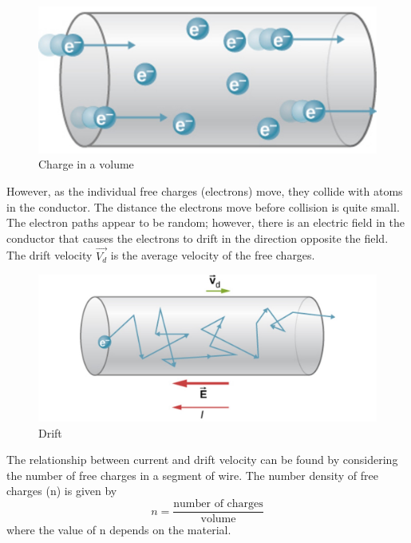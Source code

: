 \documentclass[14pt]{memoir}
\begin{document}
\begin{figure}[H]
\begin{center}
\includegraphics[scale=0.35]{fig/fig_09_07.jpg}
\caption{Charge in a volume}
\label{fig:09_07}
\end{center}
\end{figure}

However, as the individual free charges (electrons) move, they collide with atoms in the conductor. The distance the electrons move before collision is quite small. The electron paths appear to be random; however, there is an electric field in the conductor that causes the electrons to drift in the direction opposite the field. The drift velocity $\vec{V_d}$ is the average velocity of the free charges. 

\begin{figure}[H]
\begin{center}
\includegraphics[scale=0.50]{fig/fig_09_08.jpg}
\caption{Drift}
\label{fig:09_08}
\end{center}
\end{figure}

The relationship between current and drift velocity can be found by considering the number of free charges in a segment of wire. The number density of free charges (n) is given by
\begin{equation}
n = \frac{\text{number of charges}}{\text{volume}}
\end{equation}
where the value of n depends on the material. 
\end{document}
